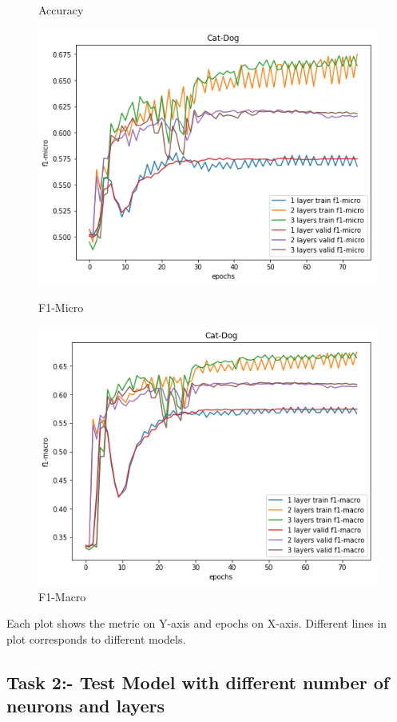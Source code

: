 \documentclass{article}
\begin{document}
\begin{figure}[!htb]
	\caption{Accuracy}\label{fig:part_2_task_1_accuracy}
	\endminipage\hfill
	\includegraphics[width=\linewidth]{../output_plots/part_2_task_1_f1-micro.png}
	\caption{F1-Micro}\label{fig:part_2_task_1_f1-micro}
	\endminipage
	\includegraphics[width=\linewidth]{../output_plots/part_2_task_1_f1-macro.png}
	\caption{F1-Macro}\label{fig:part_2_task_1_f1-macro}
	\endminipage
\end{figure}

Each plot shows the metric on Y-axis and epochs on X-axis. Different lines in plot corresponds to different models.


\subsection{Task 2:- Test Model with different number of neurons and layers}
\end{document}
